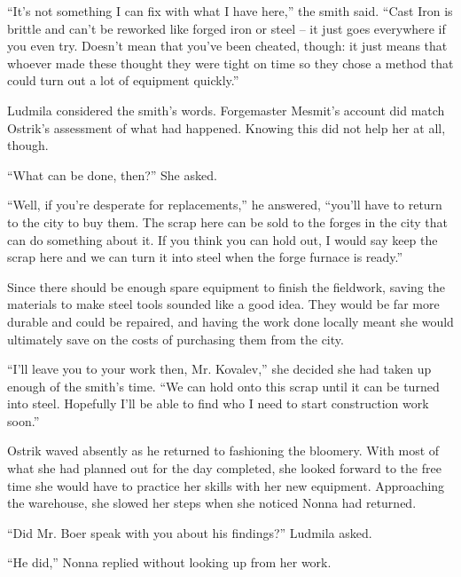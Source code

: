  

“It’s not something I can fix with what I have here,” the smith said. “Cast Iron is brittle and can’t be reworked like forged iron or steel – it just goes everywhere if you even try. Doesn’t mean that you’ve been cheated, though: it just means that whoever made these thought they were tight on time so they chose a method that could turn out a lot of equipment quickly.”

 

Ludmila considered the smith’s words. Forgemaster Mesmit’s account did match Ostrik’s assessment of what had happened. Knowing this did not help her at all, though.

 

“What can be done, then?” She asked.

 

“Well, if you’re desperate for replacements,” he answered, “you’ll have to return to the city to buy them. The scrap here can be sold to the forges in the city that can do something about it. If you think you can hold out, I would say keep the scrap here and we can turn it into steel when the forge furnace is ready.”

 

Since there should be enough spare equipment to finish the fieldwork, saving the materials to make steel tools sounded like a good idea. They would be far more durable and could be repaired, and having the work done locally meant she would ultimately save on the costs of purchasing them from the city.

 

“I’ll leave you to your work then, Mr. Kovalev,” she decided she had taken up enough of the smith’s time. “We can hold onto this scrap until it can be turned into steel. Hopefully I’ll be able to find who I need to start construction work soon.”

 

Ostrik waved absently as he returned to fashioning the bloomery. With most of what she had planned out for the day completed, she looked forward to the free time she would have to practice her skills with her new equipment. Approaching the warehouse, she slowed her steps when she noticed Nonna had returned.

 

“Did Mr. Boer speak with you about his findings?” Ludmila asked.

 

“He did,” Nonna replied without looking up from her work.

